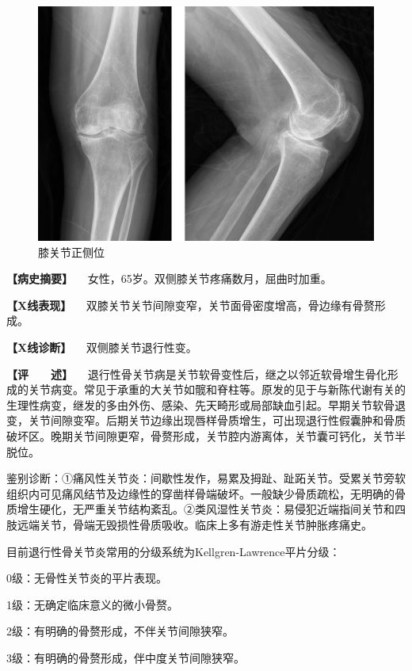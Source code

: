 \begin{figure}[!htbp]
 \centering
 \includegraphics{./images/Image00115.jpg}
 \captionsetup{justification=centering}
 \caption{膝关节正侧位}
 \label{fig2-8-1}
  \end{figure} 

\textbf{【病史摘要】} 　女性，65岁。双侧膝关节疼痛数月，屈曲时加重。

\textbf{【X线表现】}
　双膝关节关节间隙变窄，关节面骨密度增高，骨边缘有骨赘形成。

\textbf{【X线诊断】} 　双侧膝关节退行性变。

\textbf{【评　　述】}
　退行性骨关节病是关节软骨变性后，继之以邻近软骨增生骨化形成的关节病变。常见于承重的大关节如髋和脊柱等。原发的见于与新陈代谢有关的生理性病变，继发的多由外伤、感染、先天畸形或局部缺血引起。早期关节软骨退变，关节间隙变窄。后期关节边缘出现唇样骨质增生，可出现退行性假囊肿和骨质破坏区。晚期关节间隙更窄，骨赘形成，关节腔内游离体，关节囊可钙化，关节半脱位。

鉴别诊断：①痛风性关节炎：间歇性发作，易累及拇趾、趾跖关节。受累关节旁软组织内可见痛风结节及边缘性的穿凿样骨端破坏。一般缺少骨质疏松，无明确的骨质增生硬化，无严重关节结构紊乱。②类风湿性关节炎：易侵犯近端指间关节和四肢远端关节，骨端无毁损性骨质吸收。临床上多有游走性关节肿胀疼痛史。

目前退行性骨关节炎常用的分级系统为Kellgren-Lawrence平片分级：

0级：无骨性关节炎的平片表现。

1级：无确定临床意义的微小骨赘。

2级：有明确的骨赘形成，不伴关节间隙狭窄。

3级：有明确的骨赘形成，伴中度关节间隙狭窄。


